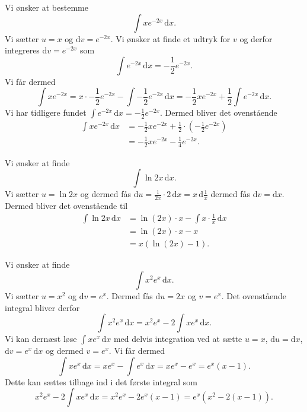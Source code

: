 \begin{eks} 
  Vi ønsker at bestemme
  \[ 
  \int x e^{-2x} \, \mathrm{d}x
  .\]
  \bigbreak
  Vi sætter $u = x$ og $\mathrm{d}v = e^{-2x}$. Vi ønsker at finde et udtryk for $v$ og derfor integreres $\mathrm{d}v = e^{-2x}$ som
  \[ 
  \int e^{-2x} \, \mathrm{d}x = -\frac{1}{2}e^{-2x}
  .\]
  Vi får dermed
  \[ 
  \int x e^{-2x} = x \cdot -\frac{1}{2}e^{-2x} - \int -\frac{1}{2} e^{-2x} \, \mathrm{d}x = -\frac{1}{2}x e^{-2x} + \frac{1}{2} \int e^{-2x} \, \mathrm{d}x
  .\]
  Vi har tidligere fundet $\int e^{-2x} \, \mathrm{d}x  = -\frac{1}{2}e^{-2x}$. Dermed bliver det ovenstående
  \begin{align*}
  \int x e^{-2x} \, \mathrm{d}x &= -\frac{1}{2}x e^{-2x} + \frac{1}{2} \cdot \left( -\frac{1}{2}e^{-2x} \right) \\
  &= -\frac{1}{2}x e^{-2x} - \frac{1}{4}e^{-2x}
  .\end{align*} 
\end{eks}

\begin{eks} 
  Vi ønsker at finde
  \[ 
  \int \ln 2x \, \mathrm{d}x
  .\]
  \bigbreak
  Vi sætter $u = \ln 2x$ og dermed fås $\mathrm{d}u = \frac{1}{2x} \cdot 2 \, \mathrm{d}x = x \, \mathrm{d} \frac{1}{x} $ dermed fås $\mathrm{d}v = \mathrm{d}x$. Dermed bliver det ovenstående til
  \begin{align*}
  \int \ln 2x \, \mathrm{d}x &= \ln (2x) \cdot x - \int x \cdot \frac{1}{x} \, \mathrm{d}x  \\
  &= \ln (2x) \cdot x - x \\
  &= x \left( \ln (2x) - 1 \right)
  .\end{align*}  
\end{eks}

\begin{eks} 
  Vi ønsker at finde
  \[ 
  \int x^2 e^{x} \, \mathrm{d}x 
  .\]
  \bigbreak
  Vi sætter $u = x^2$ og $\mathrm{d}v = e^{x}$. Dermed fås $\mathrm{d}u = 2x$ og $v = e^{x}$. Det ovenstående integral bliver derfor
  \[
  \int x^2 e^{x} \, \mathrm{d}x = x^2 e^{x} - 2\int x  e^{x} \, \mathrm{d}x
  .\]
  Vi kan dernæst løse $\int x e^{x} \, \mathrm{d}x$ med delvis integration ved at sætte $u = x$, $\mathrm{d}u = \mathrm{d}x$, $\mathrm{d}v = e^{x} \, \mathrm{d}x $ og dermed $v = e^{x}$. Vi får dermed
  \[
    \int x e^{x} \, \mathrm{d}x = x e^{x} - \int e^{x} \, \mathrm{d}x = x e^{x} - e^{x} = e^{x} \left( x - 1 \right)
  .\]
  Dette kan sættes tilbage ind i det første integral som
  \[ 
  x^2 e^{x} - 2 \int x e^{x} \, \mathrm{d}x = x^2 e^{x} - 2 e^{x} \left( x-1 \right) = e^{x} \left( x^2 - 2(x-1) \right)
  .\]
\end{eks}

